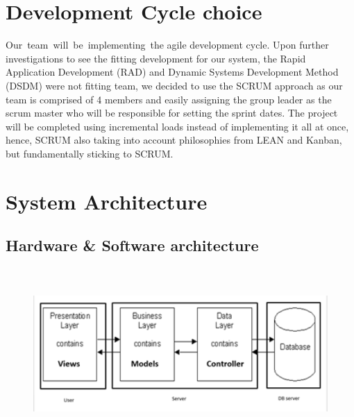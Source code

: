 \documentclass[a4paper,12pt]{report}
\begin{document}
\section*{Development Cycle choice}
 \par
\noindent 
Our~team~will~be~implementing~the agile development cycle. Upon further investigations to see the fitting development for our system, the  Rapid Application Development (RAD) and Dynamic Systems Development Method (DSDM)  were not fitting team, we decided to use the SCRUM approach as our team is comprised of 4 members and easily assigning the group leader as the scrum master who will be responsible for setting the sprint dates. The project will be completed using incremental loads instead of implementing it all at once, hence, SCRUM also taking into account philosophies from LEAN and Kanban, but fundamentally sticking to SCRUM.     \par
\vspace{12pt}
\noindent 
\section*{System Architecture}
 \par
\subsection*{Hardware & Software architecture}
 \par




\begin{figure}[H]
\begin{center}
\includegraphics[width=6.5in,height=2.57in]{./uploads_new/Lab_2.docx_DIR/media/image7.png}
\end{center}
\end{figure}
\end{document}

